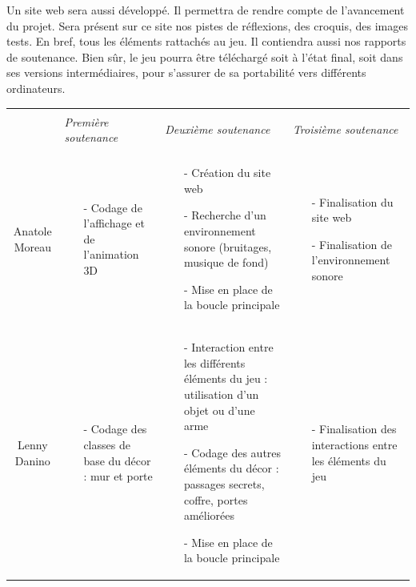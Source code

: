 \documentclass{report}
\begin{document}
Un site web sera aussi développé. Il permettra de rendre compte de l'avancement du projet. Sera présent sur ce site nos pistes de réflexions, des croquis, des images tests. En bref, tous les éléments rattachés au jeu. Il contiendra aussi nos rapports de soutenance. Bien sûr, le jeu pourra être téléchargé soit à l'état final, soit dans ses versions intermédiaires, pour s'assurer de sa portabilité vers différents ordinateurs.



\newpage
\thispagestyle{empty}

\begin{landscape}

\begin{tabular}{|c|p{6cm}|p{6cm}|p{6cm}|}


\hline
 & & & \\
   & \emph{Première soutenance} &\emph{ Deuxième soutenance} & \emph{Troisième soutenance}\\ 
& & & \\
\hline




Anatole Moreau & 
\begin{itemize}
\item[-]  Codage de l’affichage et de l’animation 3D
\end{itemize}
 &   
\begin{itemize}
\item[-] Création du site web
\item[-] Recherche d’un environnement sonore (bruitages, musique de fond)
\item[-] Mise en place de la boucle principale
\end{itemize}
&
\begin{itemize}
\item[-] Finalisation du site web
\item[-] Finalisation de l’environnement sonore
\end{itemize}
\\
\hline




Lenny Danino & 
\begin{itemize}
\item[-] Codage des classes de base du décor : mur et porte
\end{itemize}
 &   
\begin{itemize}
\item[-] Interaction entre les différents éléments du jeu : utilisation d’un objet ou d’une arme
\item[-] Codage des autres éléments du décor : passages secrets, coffre, portes améliorées
\item[-] Mise en place de la boucle principale
\end{itemize}
&
\begin{itemize}
\item[-]  Finalisation des interactions entre les éléments du jeu
\end{itemize}
\\
\hline





\end{tabular}
\end{landscape}
\end{document}
